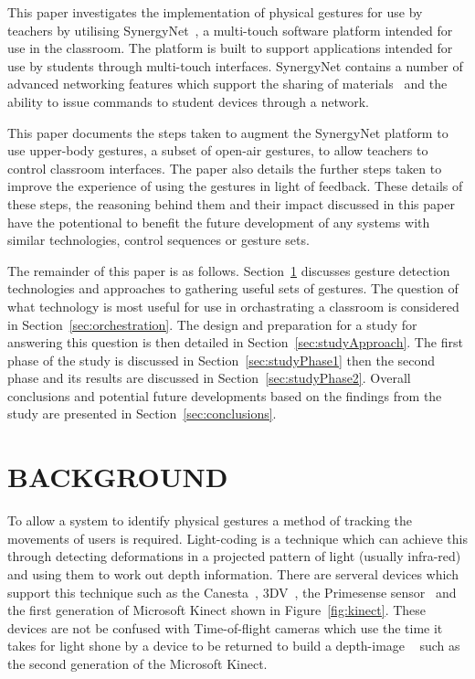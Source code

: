\documentclass[link]{IWCOMP}
\begin{document}
This paper investigates the implementation of physical gestures for use by teachers by utilising SynergyNet~\cite{HatchA.HigginsS&Mercier2009}, a multi-touch software platform intended for use in the classroom.
The platform is built to support applications intended for use by students through multi-touch interfaces.
SynergyNet contains a number of advanced networking features which support the sharing of materials~\cite{mcnaughton-et-al:jce2017} and the ability to issue commands to student devices through a network.

This paper documents the steps taken to augment the SynergyNet platform to use upper-body gestures, a subset of open-air gestures, to allow teachers to control classroom interfaces.
The paper also details the further steps taken to improve the experience of using the gestures in light of feedback.
These details of these steps, the reasoning behind them and their impact discussed in this paper have the potentional to benefit the future development of any systems with similar technologies, control sequences or gesture sets.

The remainder of this paper is as follows. 
Section~\ref{sec:background} discusses gesture detection technologies and approaches to gathering useful sets of gestures.
The question of what technology is most useful for use in orchastrating a classroom is considered in Section~\ref{sec:orchestration}.
The design and preparation for a study for answering this question is then detailed in Section~\ref{sec:studyApproach}.
The first phase of the study is discussed in Section~\ref{sec:studyPhase1} then the second phase and its results are discussed in Section~\ref{sec:studyPhase2}.
Overall conclusions and potential future developments based on the findings from the study are presented in Section~\ref{sec:conclusions}.

\section{BACKGROUND} 
\label{sec:background}


To allow a system to identify physical gestures a method of tracking the movements of users is required.
Light-coding is a technique which can achieve this through detecting deformations in a projected pattern of light (usually infra-red) and using them to work out depth information.
There are serveral devices which support this technique such as the Canesta~\cite{Yang2007}, 3DV~\cite{Wilson2007a}, the Primesense sensor~\cite{Wilson2010} and the first generation of Microsoft Kinect shown in Figure~\ref{fig:kinect}.
These devices are not be confused with Time-of-flight cameras which use the time it takes for light shone by a device to be returned to build a depth-image ~\cite{Lange2001} such as the second generation of the Microsoft Kinect.
\end{document}
